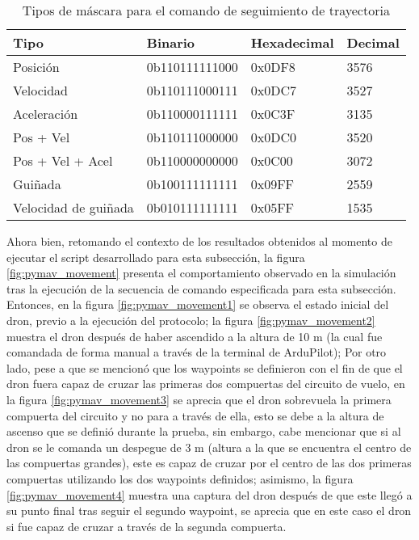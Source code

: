 \begin{table}[ht]
    \centering
    \begin{tabular}{llll}
        \hline
        Tipo & Binario & Hexadecimal & Decimal\\
        \hline
        \hline
        Posición & 0b110111111000 & 0x0DF8  & 3576 \\
        Velocidad & 0b110111000111 & 0x0DC7  & 3527\\
        Aceleración & 0b110000111111 & 0x0C3F & 3135 \\
        Pos + Vel & 0b110111000000 & 0x0DC0 & 3520\\  
        Pos + Vel + Acel & 0b110000000000 & 0x0C00 & 3072\\
        Guiñada & 0b100111111111 &  0x09FF & 2559\\
        Velocidad de  guiñada& 0b010111111111  & 0x05FF & 1535\\
        \hline
        \hline
    \end{tabular}
    \caption{Tipos de máscara para el comando de seguimiento de trayectoria}
    \label{tab:waypoint_mask}
\end{table}

Ahora bien, retomando el contexto de los resultados obtenidos al momento de ejecutar el script desarrollado para esta subsección, 
la figura \ref{fig:pymav_movement} presenta el comportamiento observado en la simulación tras la ejecución de la secuencia de comando especificada para esta subsección. Entonces, en la figura \ref{fig:pymav_movement1} se observa el estado inicial del dron, previo a la ejecución del protocolo; la figura \ref{fig:pymav_movement2} muestra el dron después de haber ascendido a la altura de 10 m (la cual fue comandada de forma manual a través de la terminal de ArduPilot); Por otro lado, pese a que se mencionó que los waypoints se definieron con el fin de que el dron fuera capaz de cruzar las primeras dos compuertas del circuito de vuelo, en la figura \ref{fig:pymav_movement3} se aprecia que el dron sobrevuela la primera compuerta del circuito y no para a través de ella, esto se debe a la altura de ascenso que se definió durante la prueba, sin embargo, cabe mencionar que si al dron se le comanda un despegue de 3 m (altura a la que se encuentra el centro de las compuertas grandes), este es capaz de cruzar por el centro de las dos primeras compuertas utilizando los dos waypoints definidos; asimismo, la figura \ref{fig:pymav_movement4} muestra una captura del dron después de que este llegó a su punto final tras seguir el segundo waypoint, se aprecia que en este caso el dron si fue capaz de cruzar a través de la segunda compuerta.

